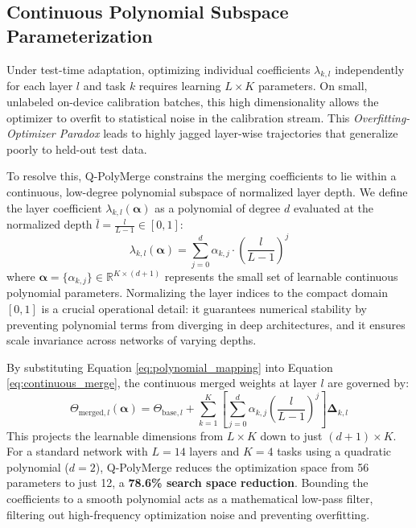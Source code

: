 \subsection{Continuous Polynomial Subspace Parameterization}
Under test-time adaptation, optimizing individual coefficients $\lambda_{k, l}$ independently for each layer $l$ and task $k$ requires learning $L \times K$ parameters. On small, unlabeled on-device calibration batches, this high dimensionality allows the optimizer to overfit to statistical noise in the calibration stream. This \emph{Overfitting-Optimizer Paradox} leads to highly jagged layer-wise trajectories that generalize poorly to held-out test data.

To resolve this, Q-PolyMerge constrains the merging coefficients to lie within a continuous, low-degree polynomial subspace of normalized layer depth. We define the layer coefficient $\lambda_{k, l}(\boldsymbol{\alpha})$ as a polynomial of degree $d$ evaluated at the normalized depth $\bar{l} = \frac{l}{L-1} \in [0, 1]$:
\begin{equation}
\label{eq:polynomial_mapping}
\lambda_{k, l}(\boldsymbol{\alpha}) = \sum_{j=0}^d \alpha_{k, j} \cdot \left( \frac{l}{L-1} \right)^j
\end{equation}
where $\boldsymbol{\alpha} = \{ \alpha_{k, j} \} \in \mathbb{R}^{K \times (d+1)}$ represents the small set of learnable continuous polynomial parameters. Normalizing the layer indices to the compact domain $[0, 1]$ is a crucial operational detail: it guarantees numerical stability by preventing polynomial terms from diverging in deep architectures, and it ensures scale invariance across networks of varying depths.

By substituting Equation \ref{eq:polynomial_mapping} into Equation \ref{eq:continuous_merge}, the continuous merged weights at layer $l$ are governed by:
\begin{equation}
\Theta_{\text{merged}, l}(\boldsymbol{\alpha}) = \Theta_{\text{base}, l} + \sum_{k=1}^K \left[ \sum_{j=0}^d \alpha_{k, j} \left( \frac{l}{L-1} \right)^j \right] \mathbf{\Delta}_{k, l}
\end{equation}
This projects the learnable dimensions from $L \times K$ down to just $(d+1) \times K$. For a standard network with $L=14$ layers and $K=4$ tasks using a quadratic polynomial ($d=2$), Q-PolyMerge reduces the optimization space from 56 parameters to just 12, a \textbf{78.6\% search space reduction}. Bounding the coefficients to a smooth polynomial acts as a mathematical low-pass filter, filtering out high-frequency optimization noise and preventing overfitting.

